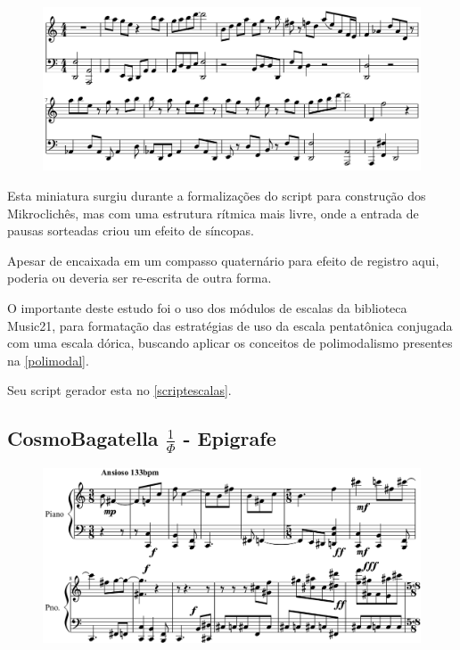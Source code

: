 \documentclass[
	12pt,				%
	openright,			%
	twoside,			%
	a4paper,			%
	english,			%
	french,				%
	spanish,			%
	brazil				%
	]{abntex2}
\begin{document}
\begin{figure}[!h]
	\begin{center}
	    \includegraphics*[scale=0.4]{score/ExperimentoPentatonico.png}
	\end{center}
\end{figure}


Esta miniatura surgiu durante a formalizações do script para construção dos Mikroclichês, mas com uma estrutura rítmica mais livre, onde a entrada de pausas sorteadas criou um efeito de síncopas.

Apesar de encaixada em um compasso quaternário para efeito de registro aqui, poderia ou deveria ser re-escrita de outra forma.

O importante deste estudo foi o uso dos módulos de escalas da biblioteca Music21, para formatação das estratégias de uso da escala pentatônica conjugada com uma escala dórica, buscando aplicar os conceitos de polimodalismo presentes na \autoref{polimodal}. 

Seu script gerador esta no \autoref{scriptescalas}.


\subsection{CosmoBagatella $ \frac{1}{\Phi} $ - Epigrafe }

\begin{figure}[!h]
	\begin{center}
	    \includegraphics*[scale=0.35]{score/epigrafe01.png}
	\end{center}
\end{figure}
\end{document}

